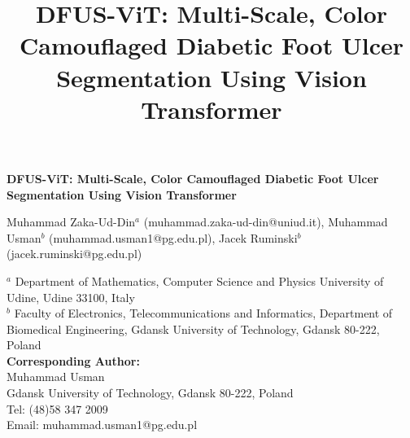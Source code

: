 \documentclass[review]{elsarticle}
\begin{document}
	\begin{frontmatter}
		
		
\begin{titlepage}
\begin{center}
\vspace*{1cm}
				
\textbf{ \large DFUS-ViT: Multi-Scale, Color Camouflaged Diabetic Foot Ulcer Segmentation Using Vision Transformer}

\vspace{1.5cm}

Muhammad Zaka-Ud-Din$^{a}$ (muhammad.zaka-ud-din@uniud.it), Muhammad Usman$^b$ (muhammad.usman1@pg.edu.pl), Jacek Ruminski$^b$ (jacek.ruminski@pg.edu.pl) \\

\hspace{10pt}
				
\begin{flushleft}
\small  
		$^a$ Department of Mathematics, Computer Science and Physics University of Udine, Udine 33100, Italy \\
		$^b$ Faculty of Electronics, Telecommunications and Informatics, Department of Biomedical Engineering, Gdansk University of Technology, Gdansk 80-222, Poland\\
					

					
	\vspace{1cm}
	\textbf{Corresponding Author:} \\
	Muhammad Usman \\
	Gdansk University of Technology, Gdansk 80-222, Poland \\
	Tel: (48)58 347 2009 \\
	Email: muhammad.usman1@pg.edu.pl
					
\end{flushleft}        
\end{center}
\end{titlepage}
		
	\title{DFUS-ViT: Multi-Scale, Color Camouflaged Diabetic Foot Ulcer Segmentation Using Vision Transformer}
	

\end{frontmatter}
\end{document}

